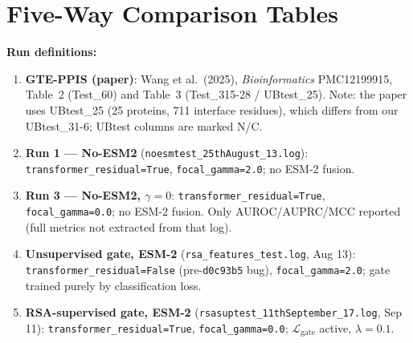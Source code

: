 \documentclass[10pt, a4paper]{article}
\newcommand{\code}[1]{\texttt{\small #1}}
\begin{document}
\section{Five-Way Comparison Tables}

\noindent\textbf{Run definitions:}
\begin{enumerate}[leftmargin=*, label=\textbf{\arabic*.}]
    \item \textbf{GTE-PPIS (paper)}: Wang et al.\ (2025), \textit{Bioinformatics}
          PMC12199915, Table~2 (Test\_60) and Table~3 (Test\_315-28 / UBtest\_25).
          Note: the paper uses UBtest\_25 (25 proteins, 711 interface residues),
          which differs from our UBtest\_31-6; UBtest columns are marked N/C.
    \item \textbf{Run 1 --- No-ESM2} (\code{noesmtest\_25thAugust\_13.log}):
          \code{transformer\_residual=True}, \code{focal\_gamma=2.0};
          no ESM-2 fusion.
    \item \textbf{Run 3 --- No-ESM2, $\gamma=0$}: \code{transformer\_residual=True},
          \code{focal\_gamma=0.0}; no ESM-2 fusion.  Only AUROC/AUPRC/MCC
          reported (full metrics not extracted from that log).
    \item \textbf{Unsupervised gate, ESM-2} (\code{rsa\_features\_test.log}, Aug 13):
          \code{transformer\_residual=False} (pre-\texttt{d0c93b5} bug),
          \code{focal\_gamma=2.0}; gate trained purely by classification loss.
    \item \textbf{RSA-supervised gate, ESM-2} (\code{rsasuptest\_11thSeptember\_17.log},
          Sep 11): \code{transformer\_residual=True}, \code{focal\_gamma=0.0};
          $\mathcal{L}_\text{gate}$ active, $\lambda=0.1$.
\end{enumerate}
\end{document}
